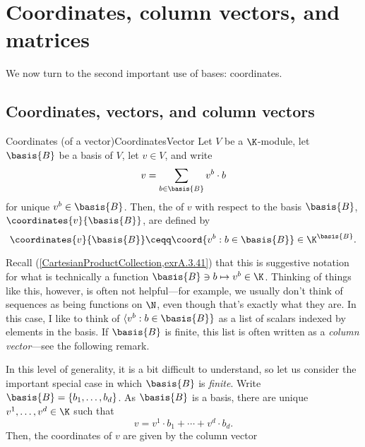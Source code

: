 \chapter{Coordinates, column vectors, and matrices}

We now turn to the second important use of bases:  coordinates.

\section{Coordinates, vectors, and column vectors}

\begin{dfn}{Coordinates (of a vector)}{CoordinatesVector}
	Let $V$ be a $\K$-module, let $\basis{B}$ be a basis of $V$, let $v\in V$, and write
	\begin{equation}
		v=\sum _{b\in \basis{B}}v^b\cdot b
	\end{equation}
	for unique $v^b\in \basis{B}$.  Then, the  of $v$ with respect to the basis $\basis{B}$, $\coordinates{v}{\basis{B}}$, are defined by
	\begin{equation}
		\coordinates{v}{\basis{B}}\ceqq \coord{v^b:b\in \basis{B}}\in \K ^{\basis{B}}.
	\end{equation}
	\begin{rmk}
		Recall (\cref{CartesianProductCollection,exrA.3.41}) that this is suggestive notation for what is technically a function $\basis{B}\ni b\mapsto v^b\in \K$.  Thinking of things like this, however, is often not helpful---for example, we usually don't think of sequences as being functions on $\N$, even though that's exactly what they are.  In this case, I like to think of $\langle v^b:b\in \basis{B}\}$ as a list of scalars indexed by elements in the basis.  If $\basis{B}$ is finite, this list is often written as a \emph{column vector}---see the following remark.
	\end{rmk}
	\begin{rmk}
		In this level of generality, it is a bit difficult to understand, so let us consider the important special case in which $\basis{B}$ is \emph{finite}.  Write $\basis{B}=\{ b_1,\ldots ,b_d\}$.  As $\basis{B}$ is a basis, there are unique $v^1,\ldots ,v^d\in \K$ such that
		\begin{equation}
			v=v^1\cdot b_1+\cdots +v^d\cdot b_d.
		\end{equation}
		Then, the coordinates of $v$ are given by the column vector
		\begin{equation}

\end{equation}
\end{rmk}
\end{dfn}
